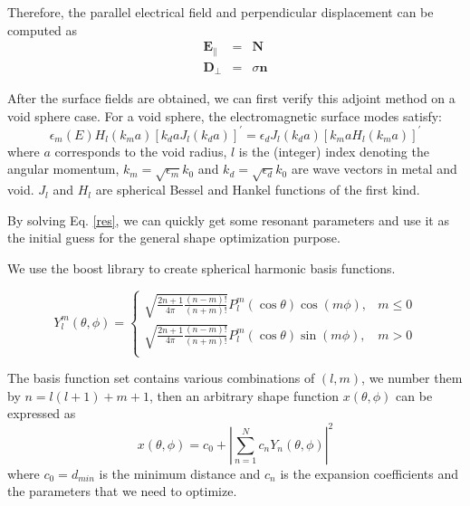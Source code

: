 \documentclass[12pt]{article}
\begin{document}
Therefore, the parallel electrical field and perpendicular displacement can be computed as
\begin{subequations}
\begin{eqnarray}
\mathbf{E}_\parallel &=& \mathbf{N}\\
\mathbf{D}_\perp &=& \sigma\mathbf{n}
\end{eqnarray}
\end{subequations}


After the surface fields are obtained, we can first verify this adjoint method on a void sphere case. For a void sphere, the electromagnetic surface modes satisfy:
\begin{equation}
\epsilon_m (E) H_l(k_ma)[k_daJ_l(k_da)]^\prime = \epsilon_d J_l(k_da)[k_maH_l(k_ma)]^\prime\label{res}
\end{equation}
where $a$ corresponds to the void radius, $l$ is the (integer) index denoting the angular momentum, $k_m=\sqrt{\epsilon_m}k_0$ and $k_d = \sqrt{\epsilon_d}k_0$ are wave vectors in metal and void. $J_l$ and $H_l$ are spherical Bessel and Hankel functions of the first kind\cite{ESM1,ESM2}. 

By solving Eq. \eqref{res}, we can quickly get some resonant parameters and use it as the initial guess for the general shape optimization purpose. %

We use the boost library to create spherical harmonic basis functions. 

\begin{equation}
Y_l^m(\theta,\phi) =\left\{\begin{array}{ll}
\sqrt{\frac{2n+1}{4\pi}\frac{(n-m)!}{(n+m)!}}P_l^m(\cos\theta)\cos(m\phi),&m\leq0\\
\sqrt{\frac{2n+1}{4\pi}\frac{(n-m)!}{(n+m)!}}P_l^m(\cos\theta)\sin(m\phi),&m>0\\\end{array}\right.
\end{equation}

The basis function set contains various combinations of $(l,m)$, we number them by $n=l(l+1)+m+1$, then an arbitrary shape function $x(\theta,\phi)$ can be expressed as 
\begin{equation}
x(\theta,\phi) = c_0 + |\sum_{n=1}^N c_nY_n(\theta,\phi)|^2\label{sh}
\end{equation}
where $c_0=d_{min}$ is the minimum distance and $c_n$ is the expansion coefficients and the parameters that we need to optimize.
\end{document}
